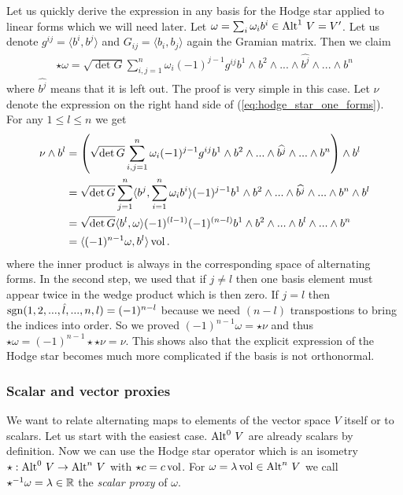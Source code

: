 \documentclass[../master_thesis.tex]{subfiles}
\begin{document}
Let us quickly derive the expression in any basis 
for the Hodge star applied to linear 
forms which we will need later. Let $\omega = \sum_i \omega_i b^i \in 
{\operatorname{Alt}^{1}\,V} = V'$. Let us denote $g^{ij} = \langle b^i, b^j \rangle$ 
and $G_{ij} = \langle b_i, b_j \rangle$ again the Gramian matrix.
Then we claim
\begin{align}
    \star \omega = \sqrt{\det G} \sum_{i,j=1}^n \omega_i (-1)^{j-1} 
        g^{ij} b^1 \wedge
        b^2 \wedge ... \wedge \widehat{b^j}\wedge ... \wedge b^n 
        \label{eq:hodge_star_one_forms}
\end{align}
where $\widehat{b^j}$ means that it is left out. The proof is very 
simple in this case. Let $\nu$ denote the expression on the right hand side 
of (\ref{eq:hodge_star_one_forms}).
For any $1 \leq l \leq n$ we get
\begin{align*}
    \nu \wedge b^l &= \left( \sqrt{\det G} \sum_{i,j=1}^n \omega_i (-1)^{j-1} g^{ij} b^1 \wedge
        b^2 \wedge ... \wedge \widehat{b^j} \wedge ... \wedge b^n\right) \wedge b^l 
    \\ &= \sqrt{\det G} \sum_{j=1}^n \langle b^j,\sum_{i=1}^n \omega_i  b^i\rangle
        (-1)^{j-1}  b^1 \wedge
        b^2 \wedge ... \wedge \widehat{b^j} \wedge ... \wedge b^n \wedge b^l
    \\ &= \sqrt{\det G} \langle b^l,\omega \rangle
        (-1)^{(l-1)}(-1)^{(n-l)}  b^1 \wedge
        b^2 \wedge ... \wedge b^l  \wedge ... \wedge b^n 
    \\ &= \langle (-1)^{n-1}\omega, b^l \rangle \operatorname{vol}.
\end{align*}
where the inner product is always in the corresponding space of alternating forms.
In the second step, we used that if $j\neq l$ then one basis element must 
appear twice in the wedge product which is then zero. If $j=l$ then 
$\operatorname{sgn} (1,2, ..., \hat{l},...,n,l) = (-1)^{n-l}$ because we need $(n-l)$
transpostions to bring the indices into order. So we proved 
$(-1)^{n-1}\omega = \star \nu$ and thus $\star \omega = (-1)^{n-1} \star\star\nu = \nu$.
This shows also that the explicit expression of the Hodge star becomes much more 
complicated if the basis is not orthonormal.


\subsubsection{Scalar and vector proxies} \label{sec:scalar_and_vector_proxies}
We want to relate alternating maps to elements of the 
vector space $V$ itself or to scalars. Let us start with the easiest 
case. ${\operatorname{Alt}^{0}\,V}$ are already scalars by definition. Now we can use 
the Hodge star operator which is an isometry 
$\star: {\operatorname{Alt}^{0}\,V} \rightarrow {\operatorname{Alt}^{n}\,V}$ with
$\star c = c \operatorname{vol}$. 
For $\omega = \lambda \operatorname{vol} \in {\operatorname{Alt}^{n}\,V}$ we call
$\star^{-1} \omega = \lambda \in \mathbb{R}$ the \textit{scalar proxy} of $\omega$.
\end{document}
